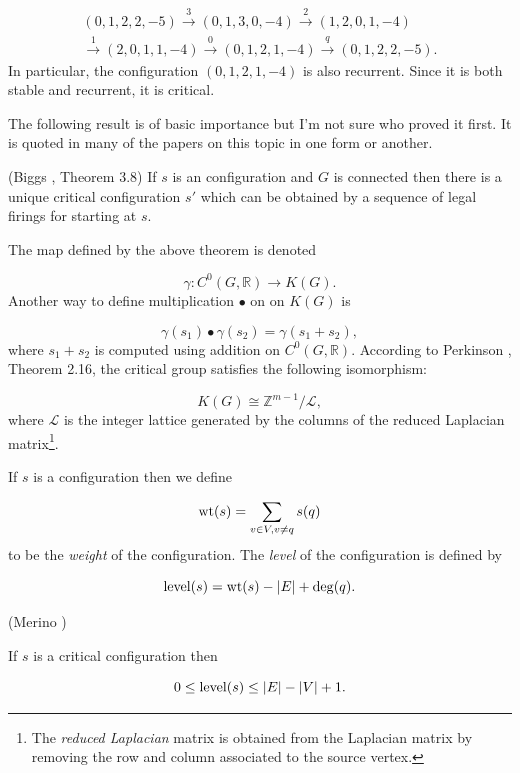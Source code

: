 \begin{example}
{\[
\begin{array}{c}
(0,1,2,2,-5)
\overset{3}{\to} (0,1,3,0,-4)
\overset{2}{\to} (1,2,0,1,-4)\\
\overset{1}{\to} (2,0,1,1,-4)
\overset{0}{\to} (0,1,2,1,-4)
\overset{q}{\to} (0,1,2,2,-5).
\end{array}
\]
In particular, the configuration $(0,1,2,1,-4)$ is
also recurrent. Since it is both stable and recurrent, it
is critical.
}
\end{example}

The following result is of basic importance but
I'm not sure who proved it first. It is quoted in many of the papers
on this topic in one form or another.

\begin{theorem} (Biggs \cite{Biggs1999}, Theorem 3.8)
{\rm
If $s$ is an configuration and $G$ is connected
then there is a unique critical configuration $s'$
which can be obtained by a sequence of legal firings
for starting at $s$.
}
\end{theorem}

The map defined by the above theorem is
denoted

\[
\gamma :C^0(G,{\mathbb{R}})\to K(G).
\]
Another way to define multiplication $\bullet$ on
on $K(G)$ is

\[
\gamma(s_1)\bullet \gamma(s_2)
=\gamma(s_1+s_2),
\]
where $s_1+s_2$ is computed using addition on
$C^0(G,{\mathbb{R}})$. According to Perkinson \cite{PerkinsonEtAl2009},
Theorem 2.16, the critical group satisfies the
following isomorphism:

\[
K(G)\cong {\mathbb{Z}}^{m-1}/{\mathcal{L}},
\]
where ${\mathcal{L}}$ is the integer lattice
generated by the columns of the reduced
Laplacian matrix\footnote{The {\it reduced Laplacian} matrix
is obtained from the Laplacian matrix by removing
the row and column associated to the source
vertex.}.

If $s$ is a configuration then we define

\[
{\rm wt}(s) = \sum_{v\in V, v\not= q} s(q)
\]
to be the {\it weight} of the configuration.
The {\it level} of the configuration is defined by

\[
{\rm level}(s) = {\rm wt}(s)-|E|+\deg(q).
\]

\begin{lemma}
(Merino \cite{Morino1999})
{\rm
If $s$ is a critical configuration then

\[
0\leq {\rm level}(s)\leq |E|-|V|+1.
\]
}
\end{lemma}

